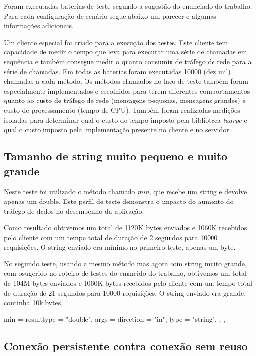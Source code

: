 \documentclass[11pt]{article}
\begin{document}
Foram executadas baterias de teste segundo a sugestão do enunciado do trabalho.
Para cada configuração de cenário segue abaixo um parecer e algumas informações
adicionais.

Um cliente especial foi criado para a execução dos testes. Este cliente tem
capacidade de medir o tempo que leva para executar uma série de chamadas em
sequência e também consegue medir o quanto consumiu de tráfego de rede para a
série de chamadas. Em todas as baterias foram executadas 10000 (dez mil)
chamadas a cada método. Os métodos chamados no laço de teste também foram
especialmente implementados e escolhidos para terem diferentes comportamentos
quanto ao custo de tráfego de rede (mensagens pequenas, mensagens grandes) e
custo de processamento (tempo de CPU). Também foram realizadas medições isoladas
para determinar qual o custo de tempo imposto pela biblioteca \textit{luarpc} e
qual o custo imposto pela implementação presente no cliente e no servidor.

\subsection{Tamanho de string muito pequeno e muito grande}\label{subsec:stringsize}

Neste teste foi utilizado o método chamado \textit{min}, que recebe um string e
devolve apenas um double. Este perfil de teste demonstra o impacto do aumento
do tráfego de dados no desempenho da aplicação.

Como resultado obtivemos um total de 1120K bytes enviados e 1060K recebidos pelo
cliente com um tempo total de duração de 2 segundos para 10000 requisições. O
string enviado era mínimo no primeiro teste, apenas um byte.

No segundo teste, usando o mesmo método mas agora com string muito grande, com
osugerido no roteiro de testes do enuncido do trabalho, obtivemos um total de
104M bytes enviados e 1060K bytes recebidos pelo cliente com um tempo total de
duração de 21 segundos para 10000 requisições. O string enviado era grande,
continha 10k bytes.

    min = {
      resulttype = "double",
      args = {
        {direction = "in", type = "string"},
      },
    },

\subsection{Conexão persistente contra conexão sem reuso}\label{subsec:persist}
\end{document}
